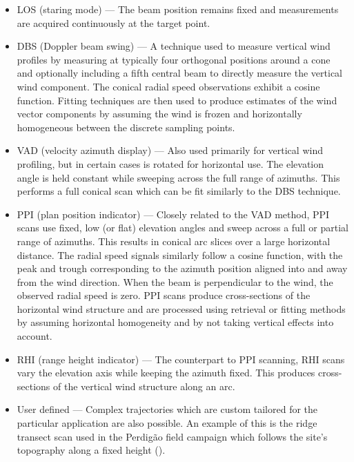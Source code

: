 \begin{itemize}
\item LOS (staring mode) --- The beam position remains fixed and measurements are acquired continuously at the target point.

\item DBS (Doppler beam swing) --- A technique used to measure vertical wind profiles by measuring at typically four orthogonal positions around a cone and optionally including a fifth central beam to directly measure the vertical wind component. The conical radial speed observations exhibit a cosine function. Fitting techniques are then used to produce estimates of the wind vector components by assuming the wind is frozen and horizontally homogeneous between the discrete sampling points.

\item VAD (velocity azimuth display) --- Also used primarily for vertical wind profiling, but in certain cases is rotated for horizontal use. The elevation angle is held constant while sweeping across the full range of azimuths. This performs a full conical scan which can be fit similarly to the DBS technique.

\item PPI (plan position indicator) --- Closely related to the VAD method, PPI scans use fixed, low (or flat) elevation angles and sweep across a full or partial range of azimuths. This results in conical arc slices over a large horizontal distance. The radial speed signals similarly follow a cosine function, with the peak and trough corresponding to the azimuth position aligned into and away from the wind direction. When the beam is perpendicular to the wind, the observed radial speed is zero. PPI scans produce cross-sections of the horizontal wind structure and are processed using retrieval or fitting methods by assuming horizontal homogeneity and by not taking vertical effects into account.

\item RHI (range height indicator) --- The counterpart to PPI scanning, RHI scans vary the elevation axis while keeping the azimuth fixed. This produces cross-sections of the vertical wind structure along an arc.

\item User defined --- Complex trajectories which are custom tailored for the particular application are also possible. An example of this is the ridge transect scan used in the Perdig\~ao field campaign which follows the site's topography along a fixed height (\cite{robert_menke_perdigao_2017}).


\end{itemize}
